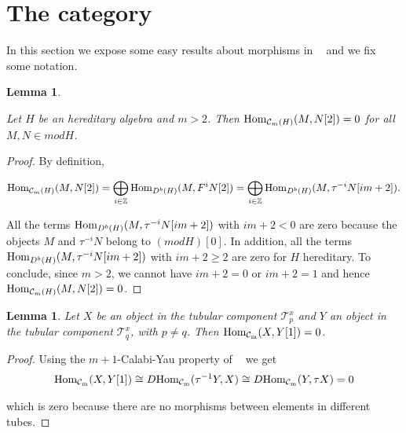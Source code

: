 \documentclass{amsart}
\theoremstyle{plain}
\newtheorem{lema}[teo]{Lemma}
\theoremstyle{definition}
\begin{document}
\section{The category  ${\mathop{\mathcal{C}_m}\nolimits}$}

  In this section we expose some easy results about  morphisms in ${\mathop{\mathcal{C}_m}\nolimits}$ and we fix some notation.

\begin{lema}\label{morfismos entre componente C y componente C[i] con i>1 son cero}

 Let  $H$ be an hereditary algebra and $m>2$. Then ${\mathop{\rm Hom}\nolimits}_{\mathcal{C}_m(H)}(M,N[2])=0$ for all  $M,N\in  mod H$.
\end{lema}

\begin{proof} By definition,

\begin{eqnarray*}
{\mathop{\rm Hom}\nolimits}_{\mathcal{C}_m(H)}(M,N[2])  =  \bigoplus_{i\in \mathbb{Z}} {\mathop{\rm Hom}\nolimits}_{D^b(H)}(M,F^iN[2]) = \bigoplus_{i\in \mathbb{Z}} {\mathop{\rm Hom}\nolimits}_{D^b(H)}(M,\tau^{-i}N[im+2]).
\end{eqnarray*}

All the terms ${\mathop{\rm Hom}\nolimits}_{D^b(H)}(M,\tau^{-i}N[im+2])$ with $im+2<0$ are zero because the objects $M$ and  $\tau^{-i}N$ belong to  $(modH)[0]$. 
In addition, all the terms ${\mathop{\rm Hom}\nolimits}_{D^b(H)}(M,\tau^{-i}N[im+2])$ with $im+2\geq2$ are zero for  $H$ hereditary. To conclude, since $m>2$, we cannot have $im+2=0$ or $im+2=1$ and hence ${\mathop{\rm Hom}\nolimits}_{\mathcal{C}_m(H)}(M,N[2]) =0$.
\end{proof}

\begin{lema}\label{morfismos entre T_p y T_q[1]}
Let $X$ be an object in the tubular component $\mathcal{T}^x_p$ and $Y$  an object in the tubular component $\mathcal{T}^x_q$, with $p\neq q$. Then ${\mathop{\rm Hom_{\mathcal{C}_m}}\nolimits}(X,Y[1])=0$.
\end{lema}

\begin{proof}
Using the  $m+1$-Calabi-Yau property of   ${\mathop{\mathcal{C}_m}\nolimits}$ we get
\begin{eqnarray*}
{\mathop{\rm Hom_{\mathcal{C}_m}}\nolimits}(X,Y[1]) \cong   D{\mathop{\rm Hom_{\mathcal{C}_m}}\nolimits}(\tau^{-1}Y,X)  \cong  D{\mathop{\rm Hom_{\mathcal{C}_m}}\nolimits}(Y,\tau X)
= 0
\end{eqnarray*}

which is zero because there are no morphisms between elements in different tubes.
\end{proof}
\end{document}
